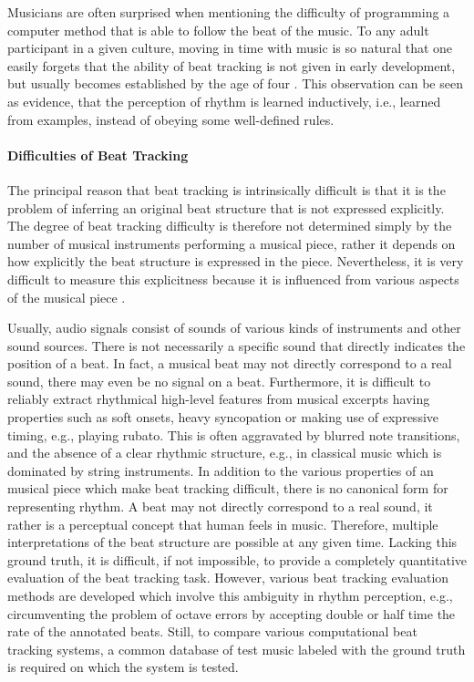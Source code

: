 \documentclass{scrartcl}
\begin{document}
\label{sec:difficulties}

Musicians are often surprised when mentioning the difficulty of programming a computer method that is able to follow the beat of the music. To any adult participant in a given culture, moving in time with music is so natural that one easily forgets that the ability of beat tracking is not given in early development, but usually becomes established by the age of four \cite{Drake2000}. This observation can be seen as evidence, that the perception of rhythm is learned inductively, i.e., learned from examples, instead of obeying some well-defined rules.


\paragraph{Difficulties of Beat Tracking}
The principal reason that beat tracking is intrinsically difficult is that it is the problem of inferring an original beat structure that is not expressed explicitly. The degree of beat tracking difficulty is therefore not determined simply by the number of musical instruments performing a musical piece, rather it depends on how explicitly the beat structure is expressed in the piece. Nevertheless, it is very difficult to measure this explicitness because it is influenced from various aspects of the musical piece \cite{Quinton2016}.

Usually, audio signals consist of sounds of various kinds of instruments and other sound sources. There is not necessarily a specific sound that directly indicates the position of a beat. In fact, a musical beat may not directly correspond to a real sound, there may even be no signal on a beat. Furthermore, it is difficult to reliably extract rhythmical high-level features from musical excerpts having properties such as soft onsets, heavy syncopation or making use of expressive timing, e.g., playing rubato. This is often aggravated by blurred note transitions, and the absence of a clear rhythmic structure, e.g., in classical music which is dominated by string instruments. In addition to the various properties of an musical piece which make beat tracking difficult, there is no canonical form for representing rhythm. A beat may not directly correspond to a real sound, it rather is a perceptual concept that human feels in music. Therefore, multiple interpretations of the beat structure are possible at any given time. Lacking this ground truth, it is difficult, if not impossible, to provide a completely quantitative evaluation of the beat tracking task. However, various beat tracking evaluation methods are developed which involve this ambiguity in rhythm perception, e.g., circumventing the problem of octave errors by accepting double or half time the rate of the annotated beats. Still, to compare various computational beat tracking systems, a common database of test music labeled with the ground truth is required on which the system is tested. 
\end{document}
